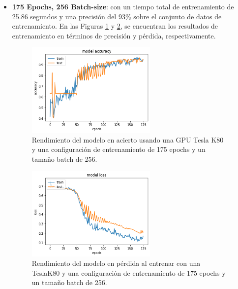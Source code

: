 \begin{itemize}
    \item \textbf{175 Epochs, 256 Batch-size}: con un tiempo total de entrenamiento de 25.86 segundos y una precisión del 93\% sobre el conjunto de datos de entrenamiento. En las Figuras \ref{fig:Resultados de la precisión de entrenamiento con un batch-size de 256 y 175 epochs} y \ref{fig:Resultados de loss en el entrenamiento con un batch-size de 256 y 175 epochs}, se encuentran los resultados de entrenamiento en términos de precisión y pérdida, respectivamente.

\begin{figure}[H]
    \centering
    \includegraphics[width=0.6\textwidth]{images/chapter5/batch_256_175_epoch.png}
    \caption{Rendimiento del modelo en acierto usando una GPU Tesla K80 y una configuración de entrenamiento de 175 epochs y un tamaño batch de 256.}
    \label{fig:Resultados de la precisión de entrenamiento con un batch-size de 256 y 175 epochs}
\end{figure}

\begin{figure}
    \centering
    \includegraphics[width=0.6\textwidth]{images/chapter5/batch_256_175_epoch_loss.png}
    \caption{Rendimiento del modelo en pérdida al entrenar con una TeslaK80 y una configuración de entrenamiento de 175 epochs y un tamaño batch de 256.}
    \label{fig:Resultados de loss en el entrenamiento con un batch-size de 256 y 175 epochs}
\end{figure}


\end{itemize}
